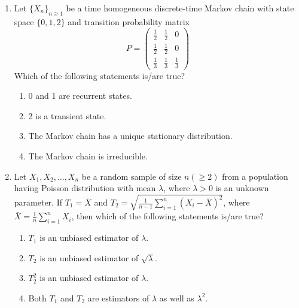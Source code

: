 \documentclass[journal,12pt,onecolumn]{IEEEtran}
\theoremstyle{remark}
\begin{document}
\renewcommand{\thetable}{\theenumi}
\begin{enumerate}
    \item Let $\{X_n\}_{n \geq 1}$ be a time homogeneous discrete-time Markov chain with state space $\{0, 1, 2\}$ and transition probability matrix
\[
    P = \begin{pmatrix} 
        \frac{1}{2} & \frac{1}{2} & 0 \\ 
        \frac{1}{2} & \frac{1}{2} & 0 \\ 
        \frac{1}{3} & \frac{1}{3} & \frac{1}{3} 
    \end{pmatrix}
\]
    Which of the following statements is/are true?
    \begin{enumerate}
        \item 0 and 1 are recurrent states.
        \item 2 is a transient state.
        \item The Markov chain has a unique stationary distribution.
        \item The Markov chain is irreducible.
    \end{enumerate}

    \item Let $X_1, X_2, \dots, X_n$ be a random sample of size $n (\geq 2)$ from a population having Poisson distribution with mean $\lambda$, where $\lambda > 0$ is an unknown parameter. If $T_1 = \bar{X}$ and $T_2 = \sqrt{\frac{1}{n-1} \sum_{i=1}^{n} (X_i - \bar{X})^2}$, where $\bar{X} = \frac{1}{n} \sum_{i=1}^{n} X_i$, then which of the following statements is/are true?
    \begin{enumerate}
        \item $T_1$ is an unbiased estimator of $\lambda$.
        \item $T_2$ is an unbiased estimator of $\sqrt{\lambda}$.
        \item $T_2^2$ is an unbiased estimator of $\lambda$.
        \item Both $T_1$ and $T_2$ are estimators of $\lambda$ as well as $\lambda^2$.
    \end{enumerate}


\end{enumerate}
\end{document}
